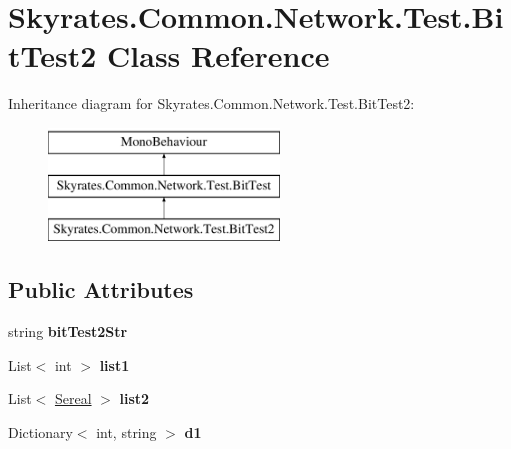 \hypertarget{class_skyrates_1_1_common_1_1_network_1_1_test_1_1_bit_test2}{\section{Skyrates.\-Common.\-Network.\-Test.\-Bit\-Test2 Class Reference}
\label{class_skyrates_1_1_common_1_1_network_1_1_test_1_1_bit_test2}
}
Inheritance diagram for Skyrates.\-Common.\-Network.\-Test.\-Bit\-Test2\-:\begin{figure}[H]
\begin{center}
\leavevmode
\includegraphics[height=3.000000cm]{class_skyrates_1_1_common_1_1_network_1_1_test_1_1_bit_test2}
\end{center}
\end{figure}
\subsection*{Public Attributes}
\begin{DoxyCompactItemize}
\item 
\hypertarget{class_skyrates_1_1_common_1_1_network_1_1_test_1_1_bit_test2_ac1961c66f2ee3df2048729cfc7bba95d}{string {\bfseries bit\-Test2\-Str}}\label{class_skyrates_1_1_common_1_1_network_1_1_test_1_1_bit_test2_ac1961c66f2ee3df2048729cfc7bba95d}

\item 
\hypertarget{class_skyrates_1_1_common_1_1_network_1_1_test_1_1_bit_test2_af9bacd4b1c33b2464afb4fbda56159e1}{List$<$ int $>$ {\bfseries list1}}\label{class_skyrates_1_1_common_1_1_network_1_1_test_1_1_bit_test2_af9bacd4b1c33b2464afb4fbda56159e1}

\item 
\hypertarget{class_skyrates_1_1_common_1_1_network_1_1_test_1_1_bit_test2_a260f7c4098435e884518ce1b63968cc5}{List$<$ \hyperlink{class_skyrates_1_1_common_1_1_network_1_1_test_1_1_bit_test_1_1_sereal}{Sereal} $>$ {\bfseries list2}}\label{class_skyrates_1_1_common_1_1_network_1_1_test_1_1_bit_test2_a260f7c4098435e884518ce1b63968cc5}

\item 
\hypertarget{class_skyrates_1_1_common_1_1_network_1_1_test_1_1_bit_test2_adc9174d135cde23fad10a1151767a558}{Dictionary$<$ int, string $>$ {\bfseries d1}}\label{class_skyrates_1_1_common_1_1_network_1_1_test_1_1_bit_test2_adc9174d135cde23fad10a1151767a558}

\end{DoxyCompactItemize}
